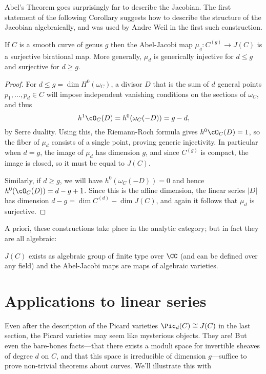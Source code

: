Abel's Theorem goes surprisingly far to describe the Jacobian. The first statement of the following Corollary suggests how to describe the structure of the Jacobian algebraically, and was used by Andre Weil in the first such construction.

\begin{corollary}
If $C$ is a smooth curve of genus $g$ then the Abel-Jacobi map $\mu_{g}: C^{(g)} \to J(C)$ is a surjective birational map.
More generally, $\mu_{d}$ is generically injective for $d\leq g$ and surjective for $d\geq g$.
\end{corollary}

\begin{proof}
For $d\leq g = \dim H^{0}(\omega_{C})$,  a divisor $D$ that is the sum of $d$ general points $p_{1}, \dots,  p_{d} \in C$ will impose independent vanishing conditions on the sections of $\omega_{C}$, and thus
$$
h^{1}\cO_{C}(D) = h^0(\omega_C(-D)) = g-d,
$$
by Serre duality. Using this, the Riemann-Roch formula gives $h^{0}\cO_{C}(D) = 1$, so the fiber of 
$\mu_{d}$ consists of a single point, proving generic injectivity. In particular when $d= g$, the image of $\mu_{d}$ has
dimension $g$, and since $C^{(g)}$ is compact, the image is closed, so it must be equal to $J(C)$.

Similarly, if $d \geq g$, we will have $h^0(\omega_C(-D)) = 0$ and hence $h^0(\cO_C(D)) = d-g+1$. Since this is the affine
dimension, the linear series $|D|$ has dimension $d-g = \dim C^{(d)} - \dim J(C)$, and again it follows that
$\mu_{d}$ is surjective.
\end{proof}


A priori, these constructions take place in the analytic category; but in fact they are all algebraic:

\begin{fact}
$J(C)$ exists as algebraic group of finite type over $\CC$ (and can be defined over any field) and the Abel-Jacobi maps are
maps of algebraic varieties.
\end{fact}

\section{Applications to linear series}

Even after the description of the Picard varieties $\Pic_d(C) \cong J(C)$ in the last section, the Picard varieties may seem like mysterious objects. They are! But even the bare-bones facts---that there exists a  moduli space for invertible sheaves of degree $d$ on $C$, and that this space is irreducible of dimension $g$---suffice to prove non-trivial theorems about curves. We'll illustrate this with 

